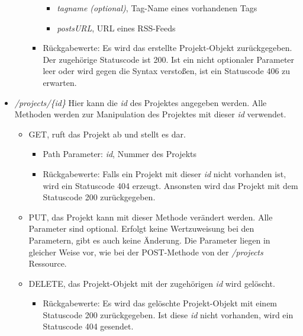 \documentclass[12pt]{scrartcl}
\begin{document}
\begin{itemize}
\begin{itemize}
\begin{itemize}
\begin{itemize}
						\item  \emph{tagname (optional)}, Tag-Name eines vorhandenen Tags
						\item \emph{postsURL}, URL eines RSS-Feeds 
					\end{itemize}
					\item Rückgabewerte: Es wird das erstellte Projekt-Objekt zurückgegeben. Der zugehörige Statuscode ist 200. Ist ein nicht optionaler Parameter leer oder wird gegen die Syntax verstoßen, ist ein Statuscode 406 zu erwarten.  
				\end{itemize}
			\end{itemize}
			\item \emph{/projects/\{id\}} Hier kann die \emph{id} des Projektes angegeben werden. Alle Methoden werden zur Manipulation des Projektes mit dieser \emph{id} verwendet.
			\begin{itemize}
				\item GET, ruft das Projekt ab und stellt es dar. 
				\begin{itemize}
					\item Path Parameter: \emph{id}, Nummer des Projekts
					\item Rückgabewerte: Falls ein Projekt mit dieser \emph{id} nicht vorhanden ist, wird ein Statuscode 404 erzeugt. Ansonsten wird das Projekt mit dem Statuscode 200 zurückgegeben.
				\end{itemize}
				\item PUT, das Projekt kann mit dieser Methode verändert werden. Alle Parameter sind optional. Erfolgt keine Wertzuweisung bei den Parametern, gibt es auch keine Änderung. Die Parameter liegen in gleicher Weise vor, wie bei der POST-Methode von der \emph{/projects} Ressource.
				\item DELETE, das Projekt-Objekt mit der zugehörigen \emph{id} wird gelöscht.
				\begin{itemize}
					\item Rückgabewerte: Es wird das gelöschte Projekt-Objekt mit einem Statuscode 200 zurückgegeben. Ist diese \emph{id} nicht vorhanden, wird ein Statuscode 404 gesendet.
				\end{itemize}	
			\end{itemize}
	\end{itemize}
\end{document}

